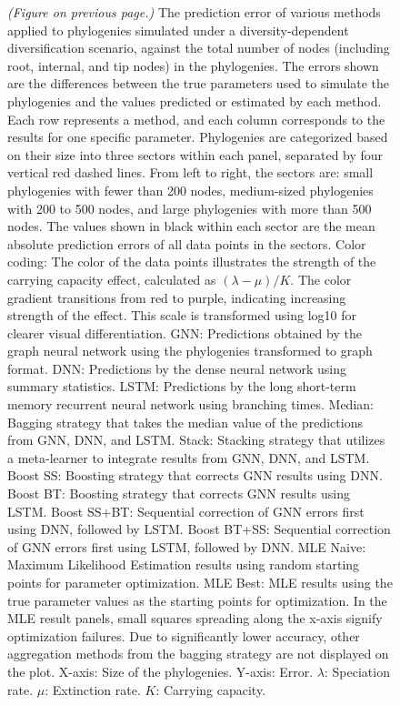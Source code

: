 {\begin{figure}
    \caption{\emph{(Figure on previous page.)} The prediction error of various methods applied to phylogenies simulated under a diversity-dependent diversification scenario, against the total number of nodes (including root, internal, and tip nodes) in the phylogenies. The errors shown are the differences between the true parameters used to simulate the phylogenies and the values predicted or estimated by each method. Each row represents a method, and each column corresponds to the results for one specific parameter. Phylogenies are categorized based on their size into three sectors within each panel, separated by four vertical red dashed lines. From left to right, the sectors are: small phylogenies with fewer than 200 nodes, medium-sized phylogenies with 200 to 500 nodes, and large phylogenies with more than 500 nodes. The values shown in black within each sector are the mean absolute prediction errors of all data points in the sectors. Color coding: The color of the data points illustrates the strength of the carrying capacity effect, calculated as $(\lambda-\mu)/K$. The color gradient transitions from red to purple, indicating increasing strength of the effect. This scale is transformed using log10 for clearer visual differentiation. GNN: Predictions obtained by the graph neural network using the phylogenies transformed to graph format. DNN: Predictions by the dense neural network using summary statistics. LSTM: Predictions by the long short-term memory recurrent neural network using branching times. Median: Bagging strategy that takes the median value of the predictions from GNN, DNN, and LSTM. Stack: Stacking strategy that utilizes a meta-learner to integrate results from GNN, DNN, and LSTM. Boost SS: Boosting strategy that corrects GNN results using DNN. Boost BT: Boosting strategy that corrects GNN results using LSTM. Boost SS+BT: Sequential correction of GNN errors first using DNN, followed by LSTM. Boost BT+SS: Sequential correction of GNN errors first using LSTM, followed by DNN. MLE Naive: Maximum Likelihood Estimation results using random starting points for parameter optimization. MLE Best: MLE results using the true parameter values as the starting points for optimization. In the MLE result panels, small squares spreading along the x-axis signify optimization failures. Due to significantly lower accuracy, other aggregation methods from the bagging strategy are not displayed on the plot. X-axis: Size of the phylogenies. Y-axis: Error. $\lambda$: Speciation rate. $\mu$: Extinction rate. $K$: Carrying capacity.}
    \label{fig::ddd_tree_size}
\end{figure}

}
